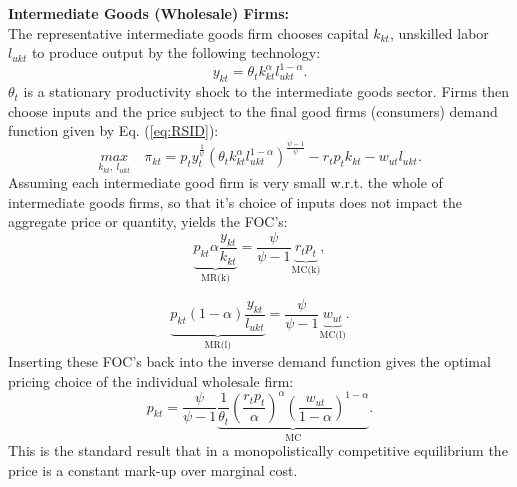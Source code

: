 \documentclass[compress,xcolor=dvipsnames]{beamer}
\begin{document}
\begin{frame}
\textbf{Intermediate Goods (Wholesale) Firms:} \\
The representative intermediate goods firm chooses capital $k_{kt}$, unskilled labor $l_{ukt}$ to produce output by the following technology:
\begin{equation}
y_{kt}=\theta_tk_{kt}^\alpha l_{ukt}^{1-\alpha}. 
\end{equation}
$\theta_t$ is  a stationary productivity shock to the intermediate goods sector. Firms then choose inputs and the price subject to the final good firms (consumers) demand function given by Eq. (\ref{eq:RSID}):
\begin{equation}
\underset{k_{kt},\ l_{ukt}}{max}\quad \pi_{kt}= p_ty_t^{\frac{1}{\psi}} \left(\theta_tk_{kt}^\alpha l_{ukt}^{1-\alpha}\right)^{\frac{\psi-1}{\psi}}-r_tp_tk_{kt}-w_{ut}l_{ukt}.
\end{equation}
Assuming each intermediate good firm is very small w.r.t. the whole of intermediate goods firms, so that it's choice of inputs does not impact the aggregate price or quantity, yields the FOC's:
\begin{equation}
\underbrace{p_{kt} \alpha \frac{y_{kt}}{k_{kt}}}_{\text{MR(k)}} =\frac{\psi}{\psi-1} \underbrace{r_tp_t}_{\text{MC(k)}},
\end{equation}
\end{frame}

\begin{frame}
\begin{equation}
\underbrace{p_{kt} (1-\alpha) \frac{y_{kt}}{l_{ukt}}}_{\text{MR(l)}} =\frac{\psi}{\psi-1}\underbrace{w_{ut}}_{\text{MC(l)}}. 
 \end{equation}
Inserting these FOC's back into the inverse demand function gives the optimal pricing choice of the individual wholesale firm:
\begin{equation} \label{eq:PRET}
p_{kt}=\frac{\psi}{\psi-1} \underbrace{\frac{1}{\theta_t} \left( \frac{r_tp_t}{\alpha} \right)^\alpha  \left( \frac{w_{ut}}{1-\alpha} \right)^{1-\alpha}}_{\text{MC}}.
\end{equation}
This is the standard \citet{dixit1977monopolistic} result that in a monopolistically competitive equilibrium the price is a constant mark-up over marginal cost. 
\end{frame}
\end{document}
